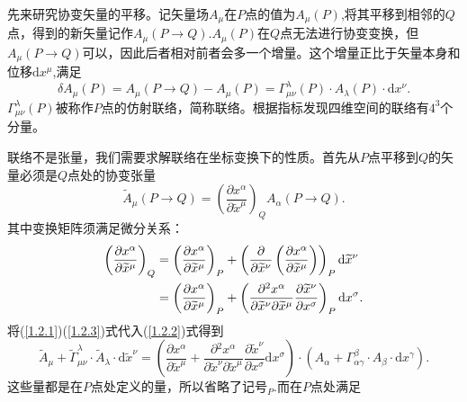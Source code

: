 \documentclass[11pt, a4paper, oneside, onecolumn]{ctexart}
\numberwithin{equation}{subsection}
\begin{document}
先来研究协变矢量的平移。记矢量场$A_{\mu}$在$P$点的值为$A_{\mu}\left(P\right)$,将其平移到相邻的$Q$点，得到的新矢量记作$A_{\mu}\left(P\to Q\right)$.$A_{\mu}\left(P\right)$在$Q$点无法进行协变变换，但$A_{\mu}\left(P\to Q\right)$可以，因此后者相对前者会多一个增量。这个增量正比于矢量本身和位移$\mathrm{d}x^{\mu}$,满足
\begin{equation}
\delta{}A_{\mu}\left(P\right)=A_{\mu}\left(P\to Q\right)-A_{\mu}\left(P\right)=\Gamma_{\mu\nu}^{\lambda}\left(P\right)\cdot A_{\lambda}\left(P\right)\cdot \mathrm{d}x^{\nu}.\label{1.2.1}
\end{equation}
$\Gamma_{\mu\nu}^{\lambda}\left(P\right)$被称作$P$点的仿射联络，简称联络。根据指标发现四维空间的联络有$4^{3}$个分量。

联络不是张量，我们需要求解联络在坐标变换下的性质。首先从$P$点平移到$Q$的矢量必须是$Q$点处的协变张量
\begin{equation}
\widetilde{A}_{\mu}\left(P\to Q\right)=\left(\frac{\partial{}x^{\alpha}}{\partial{}\widetilde{x}^{\mu}}\right)_{Q}A_{\alpha}\left(P\to Q\right).\label{1.2.2}
\end{equation}
其中变换矩阵须满足微分关系：
\begin{align}
\left(\frac{\partial{}x^{\alpha}}{\partial{}\widetilde{x}^{\mu}}\right)_{Q}&=\left(\frac{\partial{}x^{\alpha}}{\partial{}\widetilde{x}^{\mu}}\right)_{P}+\left(\frac{\partial{}}{\partial{}\widetilde{x}^{\nu}}\left(\frac{\partial{}x^{\alpha}}{\partial{}\widetilde{x}^{\mu}}\right)\right)_{P}\mathrm{d}\widetilde{x}^{\nu}\notag\\
&=\left(\frac{\partial{}x^{\alpha}}{\partial{}\widetilde{x}^{\mu}}\right)_{P}+\left(\frac{\partial{}^{2}x^{\alpha}}{\partial{}\widetilde{x}^{\nu}\partial{}\widetilde{x}^{\mu}}\frac{\partial{}\widetilde{x}^{\nu}}{\partial{}x^{\sigma}}\right)_{P}\mathrm{d}x^{\sigma}.\label{1.2.3}
\end{align}
将(\ref{1.2.1})(\ref{1.2.3})式代入(\ref{1.2.2})式得到
\begin{equation}
\widetilde{A}_{\mu}+\widetilde{\Gamma}_{\mu\nu}^{\lambda}\cdot\widetilde{A}_{\lambda}\cdot\mathrm{d}\widetilde{x}^{\nu}=\left(\frac{\partial{}x^{\alpha}}{\partial{}\widetilde{x}^{\mu}}+\frac{\partial{}^{2}x^{\alpha}}{\partial{}\widetilde{x}^{\nu}\partial{}\widetilde{x}^{\mu}}\frac{\partial{}\widetilde{x}^{\nu}}{\partial{}x^{\sigma}}\mathrm{d}x^{\sigma}\right)\cdot\left(A_{\alpha}+\Gamma_{\alpha\gamma}^{\beta}\cdot A_{\beta}\cdot\mathrm{d}x^{\gamma}\right).
\end{equation}
这些量都是在$P$点处定义的量，所以省略了记号${}_{P}$.而在$P$点处满足
\end{document}
